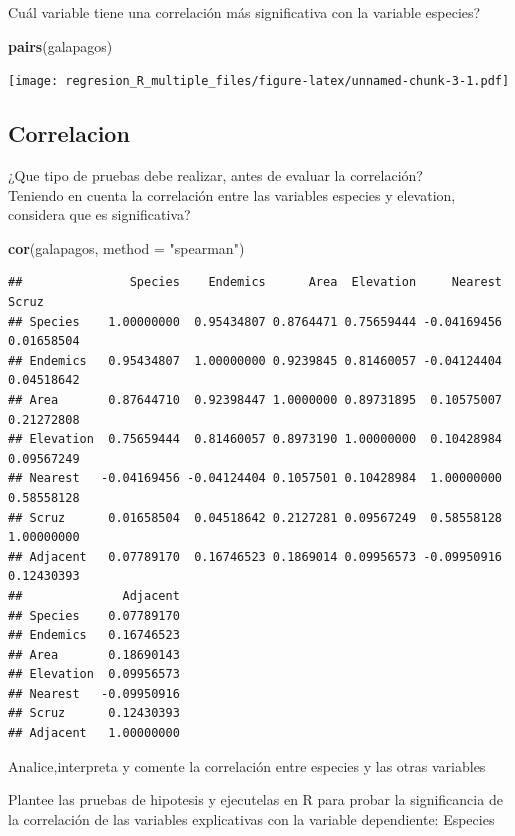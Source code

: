 \documentclass[
]{book}
\newenvironment{Shaded}{\begin{snugshade}}{\end{snugshade}}
\newcommand{\DataTypeTok}[1]{\textcolor[rgb]{0.13,0.29,0.53}{#1}}
\newcommand{\KeywordTok}[1]{\textcolor[rgb]{0.13,0.29,0.53}{\textbf{#1}}}
\newcommand{\NormalTok}[1]{#1}
\newcommand{\StringTok}[1]{\textcolor[rgb]{0.31,0.60,0.02}{#1}}
\begin{document}
Cuál variable tiene una correlación más significativa con la variable especies?

\begin{Shaded}
\begin{Highlighting}[]
\KeywordTok{pairs}\NormalTok{(galapagos)}
\end{Highlighting}
\end{Shaded}

\texttt{[image: regresion\_R\_multiple\_files/figure-latex/unnamed-chunk-3-1.pdf]}

\hypertarget{correlacion}{%
\subsection{Correlacion}\label{correlacion}}

¿Que tipo de pruebas debe realizar, antes de evaluar la correlación?\\
Teniendo en cuenta la correlación entre las variables especies y elevation, considera que es significativa?

\begin{Shaded}
\begin{Highlighting}[]
\KeywordTok{cor}\NormalTok{(galapagos, }\DataTypeTok{method =} \StringTok{"spearman"}\NormalTok{)}
\end{Highlighting}
\end{Shaded}

\begin{verbatim}
##               Species    Endemics      Area  Elevation     Nearest      Scruz
## Species    1.00000000  0.95434807 0.8764471 0.75659444 -0.04169456 0.01658504
## Endemics   0.95434807  1.00000000 0.9239845 0.81460057 -0.04124404 0.04518642
## Area       0.87644710  0.92398447 1.0000000 0.89731895  0.10575007 0.21272808
## Elevation  0.75659444  0.81460057 0.8973190 1.00000000  0.10428984 0.09567249
## Nearest   -0.04169456 -0.04124404 0.1057501 0.10428984  1.00000000 0.58558128
## Scruz      0.01658504  0.04518642 0.2127281 0.09567249  0.58558128 1.00000000
## Adjacent   0.07789170  0.16746523 0.1869014 0.09956573 -0.09950916 0.12430393
##              Adjacent
## Species    0.07789170
## Endemics   0.16746523
## Area       0.18690143
## Elevation  0.09956573
## Nearest   -0.09950916
## Scruz      0.12430393
## Adjacent   1.00000000
\end{verbatim}

Analice,interpreta y comente la correlación entre especies y las otras variables

Plantee las pruebas de hipotesis y ejecutelas en R para probar la significancia de la correlación de las variables explicativas con la variable dependiente: Especies
\end{document}
